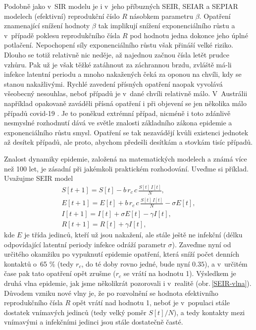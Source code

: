 Podobně jako v~SIR modelu je i v~jeho příbuzných SEIR, SEIAR a SEPIAR modelech (efektivní) reprodukční číslo $R$ násobkem parametru $\beta$. Opatření znamenající snížení hodnoty $\beta$ tak implikují snížení exponenciálního růstu a v~případě poklesu reprodukčního čísla $R$ pod hodnotu jedna dokonce jeho úplné potlačení. Nepochopení síly exponenciálního růstu však přináší velké riziko. Dlouho se totiž relativně nic neděje, až najednou začnou čísla letět prudce vzhůru. Pak už je však těžké zatáhnout za záchrannou brzdu, zvláště má-li infekce latentní periodu a mnoho nakažených čeká za oponou na chvíli, kdy se stanou nakažlivými. Rychlé zavedení přísných opatření naopak vyvolává všeobecný nesouhlas, neboť případů je v~dané chvíli relativně málo. V~Austrálii například opakovaně zaváděli přísná opatření i při objevení se jen několika málo případů covid-19 \cite{australia_opatreni}. Je to poněkud extrémní případ, nicméně i toto zdánlivě nesmyslné rozhodnutí dává ve světle znalosti základního zákona epidemie a exponenciálního růstu smysl. Opatření se tak nezavádějí kvůli existenci jednotek až desítek případů, ale proto, abychom předešli desítkám a stovkám tisíc případů. 

Znalost dynamiky epidemie, založená na matematických modelech a známá více než 100 let, je zásadní při jakémkoli praktickém rozhodování. Uveďme si příklad. Uvažujme SEIR model
\begin{equation}
	\begin{array}{l}
		\displaystyle{S[t+1] = S[t] - b\,r_c\,c \, \frac{S[t]\,I[t]}{N}}, \\[3ex]
		\displaystyle{E[t+1] = E[t] + b\,r_c\,c \, \frac{S[t]\,I[t]}{N} - \sigma E[t]}, \\[3ex]
		\displaystyle{I[t+1] = I[t] + \sigma E[t] - \gamma I[t]}, \\[3ex]
		\displaystyle{R[t+1] = R[t] + \gamma I[t]},
	\end{array}
	\label{SEIR1}
\end{equation}
kde $E$ je třída jedinců, kteří už jsou nakažení, ale stále ještě ne infekční (délku odpovídající latentní periody infekce odráží parametr $\sigma$). Zaveďme nyní od určitého okamžiku po vypuknutí epidemie opatření, která sníží počet denních kontaktů o~65 \% (tedy $r_c$, do té doby rovno jedné, bude nyní $0.35$), a v~určitém čase pak tato opatření opět zrušme ($r_c$ se vrátí na hodnotu 1). Výsledkem je druhá vlna epidemie, jak jsme několikrát pozorovali i v~realitě (obr.\,\ref{SEIR-vlna}). Důvodem vzniku nové vlny je, že po rozvolnění se hodnota efektivního reprodukčního čísla $R$ opět vrátí nad hodnotu 1, neboť je v~populaci stále dostatek vnímavých jedinců (tedy velký poměr $S[t]/N$), a tedy kontakty mezi vnímavými a infekčními jedinci jsou stále dostatečně časté.

